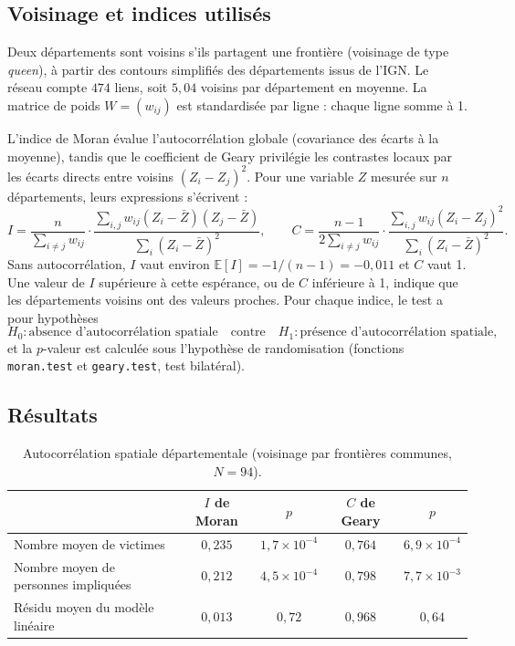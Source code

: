 \documentclass[11pt,a4paper]{article}
\begin{document}
\subsection{Voisinage et indices utilisés}
Deux départements sont voisins s'ils partagent une frontière (voisinage de type \emph{queen}), à partir des contours simplifiés des départements issus de l'IGN. Le réseau compte $474$ liens, soit $5{,}04$ voisins par département en moyenne. La matrice de poids $W = (w_{ij})$ est standardisée par ligne : chaque ligne somme à 1.

L'indice de Moran évalue l'autocorrélation globale (covariance des écarts à la moyenne), tandis que le coefficient de Geary privilégie les contrastes locaux par les écarts directs entre voisins $(Z_i - Z_j)^2$. Pour une variable $Z$ mesurée sur $n$ départements, leurs expressions s'écrivent :
\[
I = \frac{n}{\sum_{i \neq j} w_{ij}} \cdot \frac{\sum_{i,j} w_{ij}(Z_i - \bar{Z})(Z_j - \bar{Z})}{\sum_i (Z_i - \bar{Z})^2},
\qquad
C = \frac{n-1}{2\sum_{i \neq j} w_{ij}} \cdot \frac{\sum_{i,j} w_{ij}(Z_i - Z_j)^2}{\sum_i (Z_i - \bar{Z})^2}.
\]
Sans autocorrélation, $I$ vaut environ $\mathbb{E}[I] = -1/(n-1) = -0{,}011$ et $C$ vaut 1. Une valeur de $I$ supérieure à cette espérance, ou de $C$ inférieure à 1, indique que les départements voisins ont des valeurs proches. Pour chaque indice, le test a pour hypothèses
\[
H_0 : \text{absence d'autocorrélation spatiale} \quad \text{contre} \quad H_1 : \text{présence d'autocorrélation spatiale},
\]
et la $p$-valeur est calculée sous l'hypothèse de randomisation (fonctions \texttt{moran.test} et \texttt{geary.test}, test bilatéral).

\subsection{Résultats}
\begin{table}[H]
\centering
\small
\begin{tabular}{lcccc}
\toprule
 & $I$ de Moran & $p$ & $C$ de Geary & $p$ \\
\midrule
Nombre moyen de victimes            & $0{,}235$ & $1{,}7\times10^{-4}$ & $0{,}764$ & $6{,}9\times10^{-4}$ \\
Nombre moyen de personnes impliquées & $0{,}212$ & $4{,}5\times10^{-4}$ & $0{,}798$ & $7{,}7\times10^{-3}$ \\
Résidu moyen du modèle linéaire      & $0{,}013$ & $0{,}72$             & $0{,}968$ & $0{,}64$ \\
\bottomrule
\end{tabular}
\caption{Autocorrélation spatiale départementale (voisinage par frontières communes, $N = 94$).}
\label{tab:moran_contig}
\end{table}
\end{document}

